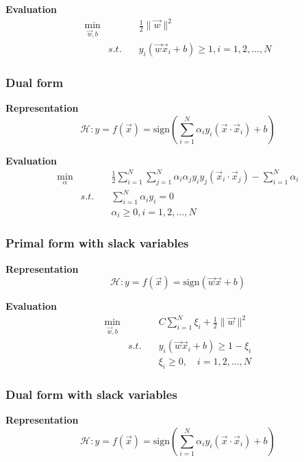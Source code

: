 \textbf{Evaluation}
\begin{eqnarray}
\min_{\vec{w},b}  && \frac{1}{2}\|\vec{w}\|^2 \\
       & s.t. \quad & y_i(\vec{w}\vec{x}_i+b)\geqslant 1, i=1,2, \dots , N
\end{eqnarray}


\subsubsection{Dual form}
\textbf{Representation}
\begin{equation}
\mathcal{H}:y=f(\vec{x})=\text{sign}\left(\sum\limits_{i=1}^N{\alpha_iy_i(\vec{x} \cdot \vec{x}_i)}+b\right)
\end{equation}

\textbf{Evaluation}
\begin{eqnarray}
 \min_{\alpha} && \frac{1}{2} \sum\limits_{i=1}^N\sum\limits_{j=1}^N \alpha_i\alpha_j y_i y_j (\vec{x}_i \cdot \vec{x}_j) - \sum\limits_{i=1}^N \alpha_i \\
               & s.t.  \quad &\sum\limits_{i=1}^N\alpha_i y_i=0 \\
               && \alpha_i \geqslant 0, i=1,2, \dots, N
\end{eqnarray}


\subsubsection{Primal form with slack variables}
\textbf{Representation}
\begin{equation}
\mathcal{H}:y=f(\vec{x})=\text{sign}(\vec{w}\vec{x}+b)
\end{equation}

\textbf{Evaluation}
\begin{eqnarray}
\min_{\vec{w},b}  &&  C \sum\limits_{i=1}^N\xi_i + \frac{1}{2}\|\vec{w}\|^2 \label{eqn:pfwr1} \\
      & s.t. \quad & y_i(\vec{w}\vec{x}_i+b)\geqslant 1-\xi_i  \label{eqn:pfwr2} \\
                  && \xi_i \geqslant 0, \quad i=1,2, \dots, N \label{eqn:pfwr3}
\end{eqnarray}


\subsubsection{Dual form with slack variables}
\textbf{Representation}
\begin{equation}
\mathcal{H}:y=f(\vec{x})=\text{sign}\left(\sum\limits_{i=1}^N{\alpha_iy_i(\vec{x} \cdot \vec{x}_i)}+b\right)
\end{equation}

